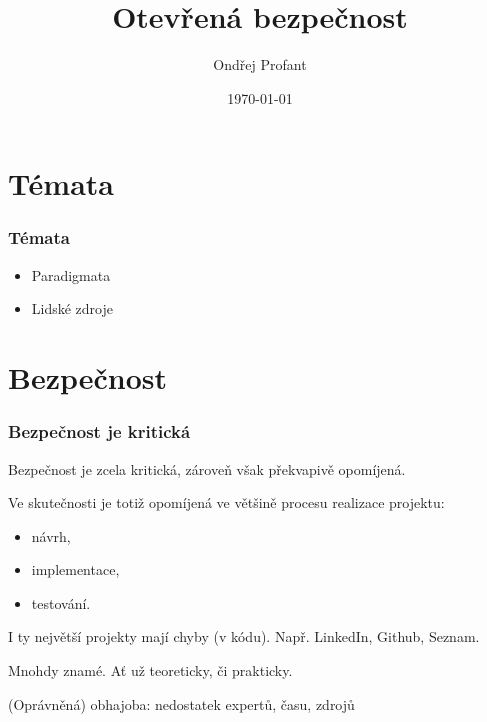 \documentclass[xetex]{beamer}
\title{Otevřená bezpečnost}
\author{Ondřej Profant}
\institute[Piráti]{Česká pirátská strana}
\date{\today}
\begin{document}

\begin{frame}
  \titlepage
\end{frame}

\section{Témata}

\begin{frame}
	\frametitle{Témata}
	\begin{itemize}
		\item Paradigmata
		\item Lidské zdroje
	\end{itemize}
\end{frame}	

\section{Bezpečnost}

\begin{frame}
	\frametitle{Bezpečnost je kritická}
	Bezpečnost je zcela kritická, zároveň však překvapivě opomíjená.

	\medskip

	Ve skutečnosti je totiž opomíjená ve většině procesu realizace projektu:

	\begin{itemize}
		\item návrh, 
		\item implementace, 
		\item testování.
	\end{itemize}

	\medskip

\end{frame}

\begin{frame}

\bigskip

I ty největší projekty mají chyby (v kódu). Např. LinkedIn, Github, Seznam.

\bigskip

Mnohdy znamé. Ať už teoreticky, či prakticky.

\bigskip

(Oprávněná) obhajoba: nedostatek expertů, času, zdrojů
\end{frame}
\end{document}
